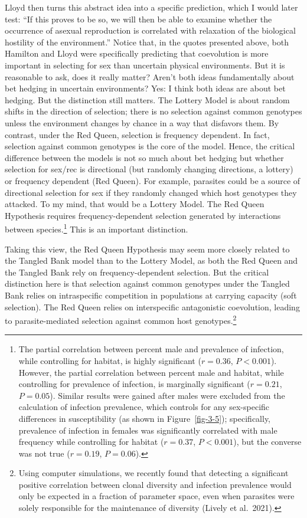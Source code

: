 \documentclass[
  letterpaper,
]{book}
\begin{document}
Lloyd then turns this abstract idea into a specific prediction, which I
would later test: ``If this proves to be so, we will then be able to
examine whether the occurrence of asexual reproduction is correlated
with relaxation of the biological hostility of the environment.'' Notice
that, in the quotes presented above, both Hamilton and Lloyd were
specifically predicting that coevolution is more important in selecting
for sex than uncertain physical environments. But it is reasonable to
ask, does it really matter? Aren't both ideas fundamentally about bet
hedging in uncertain environments? Yes: I think both ideas are about bet
hedging. But the distinction still matters. The Lottery Model is about
random shifts in the direction of selection; there is no selection
against common genotypes unless the environment changes by chance in a
way that disfavors them. By contrast, under the Red Queen, selection is
frequency dependent. In fact, selection against common genotypes is the
core of the model. Hence, the critical difference between the models is
not so much about bet hedging but whether selection for sex/rec is
directional (but randomly changing directions, a lottery) or frequency
dependent (Red Queen). For example, parasites could be a source of
directional selection for sex if they randomly changed which host
genotypes they attacked. To my mind, that would be a Lottery Model. The
Red Queen Hypothesis requires frequency-dependent selection generated by
interactions between species.\footnote{The partial correlation between
  percent male and prevalence of infection, while controlling for
  habitat, is highly significant (\(r = 0.36\), \(P < 0.001\)). However,
  the partial correlation between percent male and habitat, while
  controlling for prevalence of infection, is marginally significant
  (\(r = 0.21\), \(P = 0.05\)). Similar results were gained after males
  were excluded from the calculation of infection prevalence, which
  controls for any sex-specific differences in susceptibility (as shown
  in Figure~\ref{fig-3-5}); specifically, prevalence of infection in
  females was significantly correlated with male frequency while
  controlling for habitat (\(r = 0.37\), \(P < 0.001\)), but the
  converse was not true (\(r = 0.19\), \(P = 0.06\)).} This is an
important distinction.

Taking this view, the Red Queen Hypothesis may seem more closely related
to the Tangled Bank model than to the Lottery Model, as both the Red
Queen and the Tangled Bank rely on frequency-dependent selection. But
the critical distinction here is that selection against common genotypes
under the Tangled Bank relies on intraspecific competition in
populations at carrying capacity (soft selection). The Red Queen relies
on interspecific antagonistic coevolution, leading to parasite-mediated
selection against common host genotypes.\footnote{Using computer
  simulations, we recently found that detecting a significant positive
  correlation between clonal diversity and infection prevalence would
  only be expected in a fraction of parameter space, even when parasites
  were solely responsible for the maintenance of diversity (Lively et
  al.~2021).}
\end{document}
